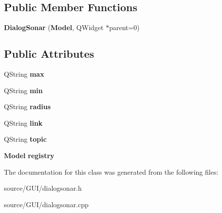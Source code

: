 \subsection*{Public Member Functions}
\begin{DoxyCompactItemize}
\item 
{\bfseries Dialog\+Sonar} ({\bf Model}, Q\+Widget $\ast$parent=0)\label{class_dialog_sonar_ac7b1ee2faf81f80838ca82ed06c3a721}

\end{DoxyCompactItemize}
\subsection*{Public Attributes}
\begin{DoxyCompactItemize}
\item 
Q\+String {\bfseries max}\label{class_dialog_sonar_acbe5d988f35ffb735a20124e4757c137}

\item 
Q\+String {\bfseries min}\label{class_dialog_sonar_a9f4e7f79ddbdfc51d6a719c17cc17517}

\item 
Q\+String {\bfseries radius}\label{class_dialog_sonar_aadf0a31eab2801f74ea6c0212176ce8c}

\item 
Q\+String {\bfseries link}\label{class_dialog_sonar_a97922949e2235eba5e1e0c68ac2de388}

\item 
Q\+String {\bfseries topic}\label{class_dialog_sonar_a9a6f0fa5efdcf7cb3dee001d624368bf}

\item 
{\bf Model} {\bfseries registry}\label{class_dialog_sonar_ae21bab679515f6491bbb8da59ddf208a}

\end{DoxyCompactItemize}


The documentation for this class was generated from the following files\+:\begin{DoxyCompactItemize}
\item 
source/\+G\+U\+I/dialogsonar.\+h\item 
source/\+G\+U\+I/dialogsonar.\+cpp\end{DoxyCompactItemize}
